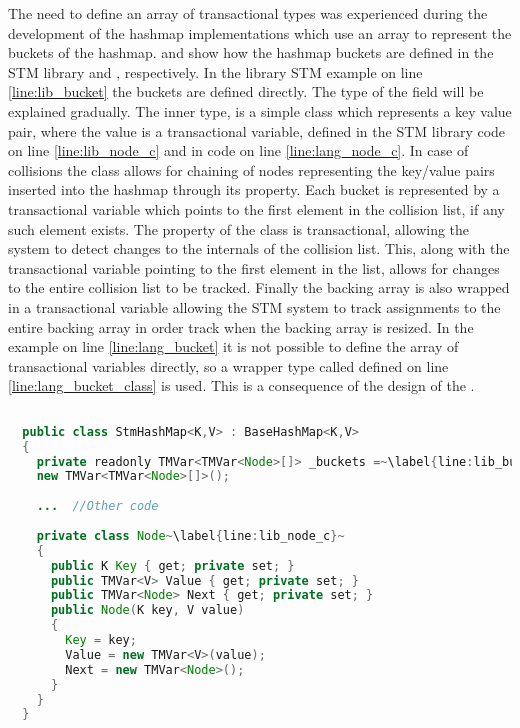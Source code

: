 The need to define an array of transactional types was experienced during the development of the hashmap implementations which use an array to represent the buckets of the hashmap.  and  show how the hashmap buckets are defined in the \ac{STM} library and \stmname, respectively. In the library \ac{STM} example on line \ref{line:lib_bucket} the buckets are defined directly. The type of the  field will be explained gradually. The inner  type, is a simple class which represents a key value pair, where the value is a transactional variable, defined in the \ac{STM} library code on line \ref{line:lib_node_c} and in \stmname code on line \ref{line:lang_node_c}. In case of collisions the  class allows for chaining of nodes representing the key/value pairs inserted into the hashmap through its  property. Each bucket is represented by a transactional variable which points to the first element in the collision list, if any such element exists. The  property of the  class is transactional, allowing the system to detect changes to the internals of the collision list. This, along with the transactional variable pointing to the first element in the list, allows for changes to the entire collision list to be tracked. Finally the backing array is also wrapped in a transactional variable allowing the \ac{STM} system to track assignments to the entire backing array in order track when the backing array is resized. In the \stmname example on line \ref{line:lang_bucket} it is not possible to define the array of transactional variables directly, so a wrapper type called  defined on line \ref{line:lang_bucket_class} is used. This is a consequence of the design of the \stmname.

\begin{lstlisting}[float,label=lst:lib_Buckets,
  caption={HashMap Buckets Array - \ac{STM} Library},
  language=Java,  
  showspaces=false,
  showtabs=false,
  breaklines=true,
  showstringspaces=false,
  breakatwhitespace=true,
  escapechar=~,
  commentstyle=\color{greencomments},
  keywordstyle=\color{bluekeywords},
  stringstyle=\color{redstrings},
  morekeywords={atomic, retry, orelse, var, get, set, ref, out, readonly}]  % Start your code-block
  
  public class StmHashMap<K,V> : BaseHashMap<K,V>
  {
    private readonly TMVar<TMVar<Node>[]> _buckets =~\label{line:lib_bucket}~
    new TMVar<TMVar<Node>[]>();
  
    ...  //Other code
  
    private class Node~\label{line:lib_node_c}~
    {
      public K Key { get; private set; }
      public TMVar<V> Value { get; private set; }
      public TMVar<Node> Next { get; private set; }
      public Node(K key, V value)
      {
        Key = key;
        Value = new TMVar<V>(value);
        Next = new TMVar<Node>();
      }
    }
  }
\end{lstlisting}

